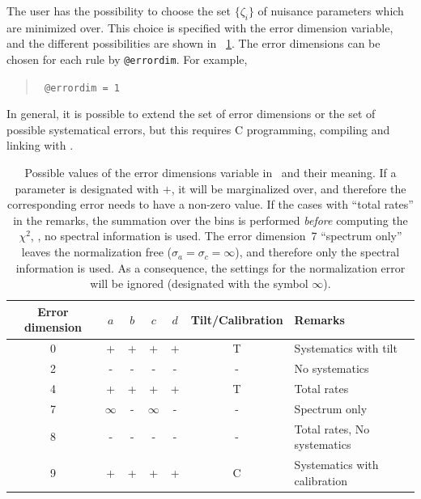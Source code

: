 The user has the possibility to choose the set $\{\zeta_i\}$ of nuisance 
parameters which are minimized over. This choice is specified with the 
error dimension variable, and the different possibilities are shown in
\Tab~\ref{tab:error_dim}. The error dimensions can be chosen for each rule 
by {\tt @errordim}. For example, 
\begin{quote}
{\tt 
\tb @errordim = 1
}
\end{quote}
In general, it is possible to extend the set of error dimensions or the 
set of possible systematical errors, but this requires C programming, 
compiling and linking with \GLOBES. 

\begin{center}
\begin{table}[t!]
\begin{center}
\begin{tabular}[h]{|c|cccc|c|l|}
\hline
Error dimension&$a$&$b$&$c$&$d$&Tilt/Calibration&Remarks\\
\hline
\hline
0&+&+&+&+&T&Systematics with tilt\\
2&-&-&-&-&-&No systematics\\
4&+&+&+&+&T&Total rates\\
7& $\infty$ &-& $\infty$ &-&-&Spectrum only\\
8&-&-&-&-&-&Total rates, No systematics\\
9&+&+&+&+&C&Systematics with calibration\\
\hline
\end{tabular}
\caption[Table of error dimensions]{\label{tab:error_dim}
Possible values of the error dimensions variable in \GLOBES\ and their meaning. If a parameter is designated with $+$, it will
be marginalized over, and therefore the corresponding error needs to 
have a non-zero value. If the cases with ``total rates'' in the remarks, 
the summation over the bins is performed \emph{before} computing 
the $\chi^2$, \ie, no spectral information is used. 
The error dimension~7 ``spectrum only'' leaves the 
normalization free ($\sigma_a=\sigma_c=\infty$), and therefore 
only the spectral information is used. As a consequence,
the settings for the normalization error will be ignored (designated 
with the symbol $\infty$). 
 }
\end{center} 
\end{table} 
\end{center}


